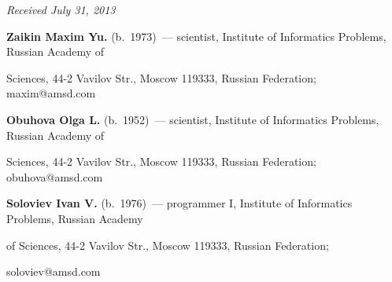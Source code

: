 \vspace*{-6pt}





\hfill{\small\textit{Received July 31, 2013}}





\vspace*{-6pt}








\Contr


\noindent


\textbf{Zaikin Maxim Yu.} (b.\ 1973)~--- scientist, Institute of Informatics Problems, Russian Academy of


Sciences, 44-2 Vavilov Str., Moscow 119333, Russian Federation; maxim@amsd.com





\vspace*{3pt}





\noindent


\textbf{Obuhova Olga L.} (b.\ 1952)~--- scientist, Institute of Informatics Problems, Russian Academy of


Sciences, 44-2 Vavilov Str., Moscow 119333, Russian Federation; obuhova@amsd.com





\vspace*{3pt}





\noindent


\textbf{Soloviev Ivan V.} (b.\ 1976)~--- programmer I, Institute of Informatics Problems, Russian Academy


of Sciences, 44-2 Vavilov Str., Moscow 119333, Russian Federation;


soloviev@amsd.com





\label{end\stat}





\renewcommand{\bibname}{\protect\rmfamily Литература}





